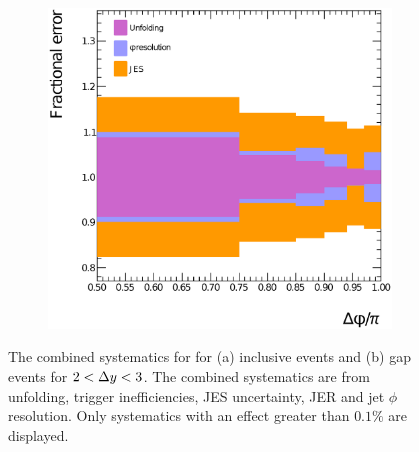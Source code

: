 \begin{figure}
\begin{subfigure}[b]{0.5\textwidth}
                \includegraphics[width=\textwidth]{figures/GBJ2/FinalPlots/CrossSection.Gap.DPhiBins.2dY3.systematics-Edit.eps}
        \end{subfigure}%
\caption[Combined systematics for \dphiDist{}]{
The combined systematics for \dphiDist{}  for (a) inclusive events and (b) gap events for  $2<\mbox{$\Delta y$}{}<3$.
The combined systematics are from unfolding, trigger inefficiencies, JES uncertainty, JER and jet $\phi$ resolution.
Only systematics with an effect greater than $0.1\%$ are displayed.
\label{GBJ2:SysComb:dphi23}}
\end{figure}


